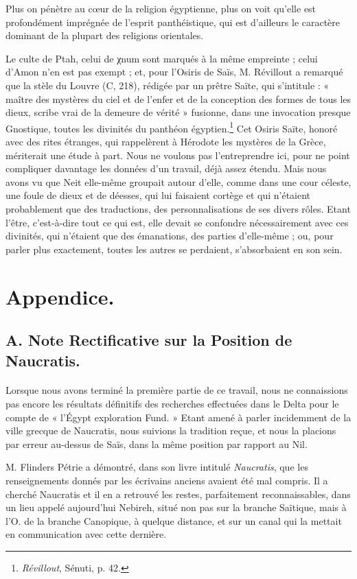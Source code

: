 \documentclass[a4paper, 11pt, oneside]{article}
\begin{document}
Plus on pénètre au cœur de la religion égyptienne, plus on voit qu'elle est profondément imprégnée de l'esprit panthéistique, qui est d'ailleurs le caractère dominant de la plupart des religions orientales.

Le culte de Ptah, celui de χnum sont marqués à la même empreinte ; celui d'Amon n'en est pas exempt ; et, pour l'Osiris de Saïs, M. Révillout a remarqué que la stèle du Louvre (C, 218), rédigée par un prêtre Saïte, qui s'intitule : « maître des mystères du ciel et de l'enfer et de la conception des formes de tous les dieux, scribe vrai de la demeure de vérité » fusionne, dans une invocation presque Gnostique, toutes les divinités du panthéon égyptien.\footnote{\emph{Révillout}, Sénuti, p. 42.} Cet Osiris Saïte, honoré avec des rites étranges, qui rappelèrent à Hérodote les mystères de la Grèce, mériterait une étude à part. Nous ne voulons pas l'entreprendre ici, pour ne point compliquer davantage les données d'un travail, déjà assez étendu. Mais nous avons vu que Neit elle-même groupait autour d'elle, comme dans une cour céleste, une foule de dieux et de déesses, qui lui faisaient cortège et qui n'étaient probablement que des traductions, des personnalisations de ses divers rôles. Etant l'être, c'est-à-dire tout ce qui est, elle devait se confondre nécessairement avec ces divinités, qui n'étaient que des émanations, des parties d'elle-même ; ou, pour parler plus exactement, toutes les autres se perdaient, s'absorbaient en son sein.
\clearpage
\section{Appendice.}
\subsection{A. Note Rectificative sur la Position de Naucratis.}
\paragraph{}
Lorsque nous avons terminé la première partie de ce travail, nous ne connaissions pas encore les résultats définitifs des recherches effectuées dans le Delta pour le compte de « l'Égypt exploration Fund. » Etant amené à parler incidemment de la ville grecque de Naucratis, nous suivions la tradition reçue, et nous la placions par erreur au-dessus de Saïs, dans la même position par rapport au Nil.

M. Flinders Pétrie a démontré, dans son livre intitulé \emph{Naucratis}, que les renseignements donnés par les écrivains anciens avaient été mal compris. Il a cherché Naucratis et il en a retrouvé les restes, parfaitement reconnaissables, dans un lieu appelé aujourd'hui Nebireh, situé non pas sur la branche Saïtique, mais à l'O. de la branche Canopique, à quelque distance, et sur un canal qui la mettait en communication avec cette dernière.
\end{document}
